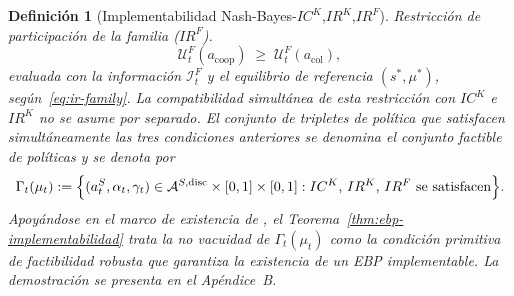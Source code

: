 \documentclass[pdflatex,sn-mathphys-ay]{sn-jnl}
\theoremstyle{thmstyleone}
\theoremstyle{thmstyletwo}
\theoremstyle{thmstylethree}
\newtheorem{definition}{Definición}
\newcommand{\1}{\mathbf{1}}
\begin{document}
\begin{definition}[Implementabilidad Nash-Bayes-$IC^K$,$IR^K$,$IR^F$]
\smallskip
\noindent Restricción de participación de la familia \textup{(}$IR^F$\textup{)}.
\[
\mathcal{U}^F_t(a_{\mathrm{coop}})\;\ge\;\mathcal{U}^F_t(a_{\mathrm{col}}),
\]
evaluada con la información $\mathcal{I}_t^F$ y el equilibrio de referencia $(s^\ast,\mu^\ast)$, según~\eqref{eq:ir-family}.
La compatibilidad simultánea de esta restricción con $IC^K$ e $IR^K$ no se asume por separado. El conjunto de tripletes de política que satisfacen simultáneamente las tres condiciones anteriores se denomina el conjunto factible de políticas y se denota por
\begin{equation}
\label{eq:gamma-factible}
\Gamma_t(\mu_t)
:=\Bigl\{(a_t^S,\alpha_t,\gamma_t)\in
\mathcal{A}^{S,\mathrm{disc}}\times[0,1]\times[0,1] :
IC^K,\,IR^K,\,IR^F
\text{ se satisfacen}\Bigr\}.
\end{equation}
Apoyándose en el marco de existencia de \citet{KadanRenySwinkels2017}, el Teorema~\ref{thm:ebp-implementabilidad} trata la no vacuidad de $\Gamma_t(\mu_t)$ como la condición primitiva de factibilidad robusta que garantiza la existencia de un EBP implementable. La demostración se presenta en el Apéndice~B.
\end{definition}
\end{document}
